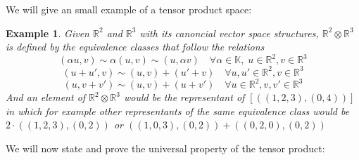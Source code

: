 \documentclass[11pt,a4paper,openright,oneside]{book}
\numberwithin{equation}{section}
\newtheorem{defn0}{Definition}[chapter]
\newtheorem{example0}[defn0]{Example}
\newenvironment{definition}{ \begin{defn0}}{\end{defn0}}
\newenvironment{example}{ \begin{example0}\rm}{\end{example0}}
\begin{document}
We will give an small example of a tensor product space:

\begin{example}
    Given $\mathbb{R}^2$ and $\mathbb{R}^3$ with its canoncial vector space
    structures, $\mathbb{R}^2 \otimes \mathbb{R}^3$ is defined by the equivalence classes that follow the relations
    $$(\alpha u, v) \sim \alpha (u, v) \sim (u, \alpha v) \quad \forall \alpha \in \mathbb{K}, \; u \in \mathbb{R}^2, v \in \mathbb{R}^3$$
    $$(u + u', v) \sim (u, v) + (u' + v) \quad \forall u, u' \in \mathbb{R}^2, v \in \mathbb{R}^3$$
    $$(u, v + v') \sim (u, v) + (u + v') \quad \forall u \in \mathbb{R}^2, v, v' \in \mathbb{R}^3$$
    And an element of $\mathbb{R}^2 \otimes \mathbb{R}^3$ would be the representant of $[((1, 2, 3), (0, 4))]$ in which
    for example other representants of the same equivalence class would be $2 \cdot ((1,2,3), (0, 2))$ or ${((1, 0, 3), (0, 2)) + ((0,2,0), (0, 2))}$
\end{example}


We will now state and prove the universal property of the tensor product:
\end{document}
